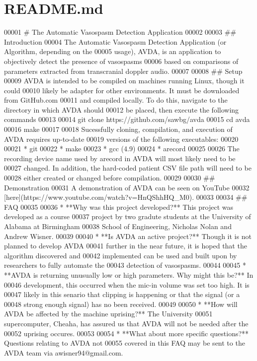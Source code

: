 \hypertarget{README_8md_source}{\section{R\+E\+A\+D\+M\+E.\+md}
}

\begin{DoxyCode}
00001 # The Automatic Vasospasm Detection Application
00002 
00003 ## Introduction
00004 The Automatic Vasospasm Detection Application (or Algorithm, depending on the
00005 usage), AVDA, is an application to objectively detect the presence of vasospasms
00006 based on comparisons of parameters extracted from transcranial doppler audio.
00007 
00008 ## Setup
00009 AVDA is intended to be compiled on machines running Linux, though it could
00010 likely be adapter for other environments. It must be downloaded from GitHub.com
00011 and compiled locally. To do this, navigate to the directory in which AVDA should
00012 be placed, then execute the following commands
00013 
00014    git clone https://github.com/sawbg/avda
00015    cd avda
00016    make
00017 
00018 Sucessfully cloning, compilation, and execution of AVDA requires up-to-date
00019 versions of the following executables:
00020 
00021 * git
00022 * make
00023 * gcc (4.9)
00024 * arecord
00025 
00026 The recording device name used by arecord in AVDA will most likely need to be
00027 changed. In addition, the hard-coded patient CSV file path will need to be
00028 either created or changed before compilation.
00029 
00030 ## Demonstration
00031 A demonstration of AVDA can be seen on YouTube 
00032 [here](https://www.youtube.com/watch?v=HnQShhHQ\_M0).
00033 
00034 ## FAQ
00035 
00036 * **Why was this project developed?** This project was developed as a course 
00037 project by two gradute students at the University of Alabama at Birmingham
00038 School of Engineering, Nicholas Nolan and Andrew Wisner.
00039 
00040 * **Is AVDA an active project?** Though it is not planned to develop AVDA
00041 further in the near future, it is hoped that the algorithm discovered and
00042 implemented can be used and built upon by researchers to fully automate the
00043 detection of vasospasms.
00044 
00045 * **AVDA is returning unusually low or high parameters. Why might this be?** In
00046   development, this occurred when the mic-in volume was set too high. It is
00047 likely in this senario that clipping is happening or that the signal (or a
00048 strong enough signal) has no been received.
00049 
00050 * **How will AVDA be affected by the machine uprising?** The University
00051   supercomputer, Cheaha, has assured us that AVDA will not be needed after the
00052 uprising occures.
00053 
00054 * **What about more specific questions?** Questions relating to AVDA not
00055 covered in this FAQ may be sent to the AVDA team via awisner94@gmail.com.
\end{DoxyCode}
